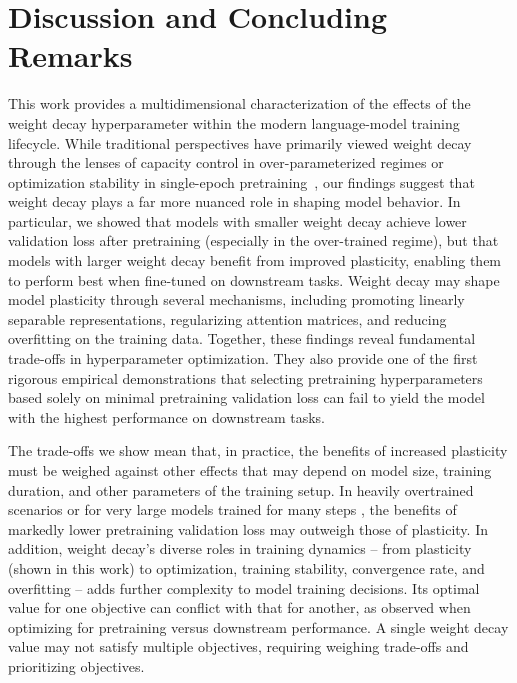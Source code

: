 \section{Discussion and Concluding Remarks}
\label{sec:discussion}

This work provides a multidimensional characterization of the effects of the weight decay hyperparameter within the modern language-model training lifecycle. While traditional perspectives have primarily viewed weight decay through the lenses of capacity control in over-parameterized regimes or optimization stability in single-epoch pretraining~\citep{zhang2017understanding, andriushchenko2023whywd}, our findings suggest that weight decay plays a far more nuanced role in shaping model behavior. In particular, we showed that models with smaller weight decay achieve lower validation loss after pretraining (especially in the over-trained regime), but that models with larger weight decay benefit from improved plasticity, enabling them to perform best when fine-tuned on downstream tasks. Weight decay may shape model plasticity through several mechanisms, including promoting linearly separable representations, regularizing attention matrices, and reducing overfitting on the training data.
Together, these findings reveal fundamental trade-offs in hyperparameter optimization. They also provide one of the first rigorous empirical demonstrations that selecting pretraining hyperparameters based solely on minimal pretraining validation loss can fail to yield the model with the highest performance on downstream tasks. 

The trade-offs we show mean that, in practice, the benefits of increased plasticity must be weighed against other effects that may depend on model size, training duration, and other parameters of the training setup. In heavily overtrained scenarios or for very large models trained for many steps \citep{singh2025openai,comanici2025gemini,anthropic2025system}, the benefits of markedly lower pretraining validation loss may outweigh those of plasticity. 
In addition, weight decay's diverse roles in training dynamics -- from plasticity (shown in this work) to optimization, training stability, convergence rate, and overfitting \citep{hoffmann2022training,andriushchenko2023whywd,kosson2025weight} -- adds further complexity to model training decisions. Its optimal value for one objective can conflict with that for another, as observed when optimizing for pretraining versus downstream performance. A single weight decay value may not satisfy multiple objectives, requiring weighing trade-offs and prioritizing objectives.



